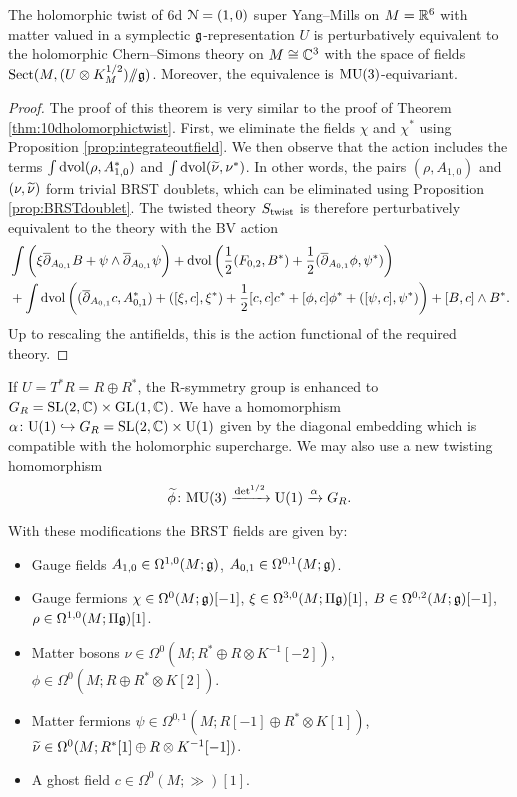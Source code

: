 \documentclass[10pt, oneside]{article}
\begin{document}
\begin{theorem}
The holomorphic twist of 6d $\mathcal N=(1, 0)$ super Yang--Mills on $M=\mathbb R^6$ with matter valued in a symplectic $\mathfrak g$-representation $U$ is perturbatively equivalent to the holomorphic Chern--Simons theory on $M\cong \mathbb C^3$ with the space of fields $\mathrm{Sect}(M, (U\otimes K_M^{1/2})/\!\!/ \mathfrak g)$. Moreover, the equivalence is $\mathrm{MU}(3)$-equivariant.
\label{thm:6dholomorphictwist}
\end{theorem}
\begin{proof}
The proof of this theorem is very similar to the proof of Theorem \ref{thm:10dholomorphictwist}. First, we eliminate the fields $\chi$ and $\chi^*$ using Proposition \ref{prop:integrateoutfield}.  We then observe that the action includes the terms $\int \operatorname{dvol}  (\rho, A_{1,0}^*)$ and $\int \operatorname{dvol} (\widetilde{\nu}, \nu^*)$.  In other words, the pairs $(\rho, A_{1,0})$ and $(\nu, \widetilde{\nu})$ form trivial BRST doublets, which can be eliminated using Proposition \ref{prop:BRSTdoublet}. The twisted theory $S_{\rm twist}$ is therefore perturbatively equivalent to the theory with the BV action 
\begin{align*}
& \int \bigg(\xi \overline{\partial}_{A_{0,1}} B  + \psi \wedge \overline{\partial}_{A_{0,1}} \psi \bigg) + \operatorname{dvol} \left(  \frac 12 (F_{0,2}, B^*) + \frac 12 (\overline{\partial}_{A_{0,1}} \phi, \psi^*)\right) \\
 &+ \int \operatorname{dvol}\left((\overline{\partial}_{A_{0, 1}} c, A_{0, 1}^*) + ([\xi, c], \xi^*) + \frac{1}{2}[c, c]c^* +  [\phi, c] \phi^* + ([\psi, c],\psi^*)\right) + [B, c] \wedge B^* .
\end{align*}
Up to rescaling the antifields, this is the action functional of the required theory.
\end{proof}

If $U=T^*R=R\oplus R^*$, the R-symmetry group is enhanced to $G_R=\mathrm{SL}(2, \mathbb C)\times \mathrm{GL}(1, \mathbb C)$. We have a homomorphism $\alpha\colon \mathrm{U}(1)\hookrightarrow G_R=\mathrm{SL}(2, \mathbb C)\times \mathrm{U}(1)$ given by the diagonal embedding which is compatible with the holomorphic supercharge. We may also use a new twisting homomorphism
\[\widetilde{\phi}\colon\mathrm{MU}(3)\xrightarrow{\det^{1/2}}\mathrm{U}(1)\xrightarrow{\alpha} G_R.\]

With these modifications the BRST fields are given by:
\begin{itemize}
\item Gauge fields $A_{1, 0} \in \Omega^{1, 0}(M; \mathfrak g)$, $A_{0, 1}\in\Omega^{0, 1}(M; \mathfrak g)$.
\item Gauge fermions $\chi\in\Omega^0(M; \mathfrak g)[-1]$, $\xi\in\Omega^{3, 0}(M; \Pi\mathfrak g)[1]$, $B\in\Omega^{0, 2}(M; \mathfrak g)[-1]$, $\rho\in\Omega^{1, 0}(M; \Pi\mathfrak g)[1]$.
\item Matter bosons $\nu\in\Omega^0(M; R^*\oplus R\otimes K^{-1}[-2])$, $\phi\in\Omega^0(M; R\oplus R^*\otimes K[2])$.
\item Matter fermions $\psi\in \Omega^{0, 1}(M; R[-1]\oplus R^*\otimes K[1])$, $\widetilde{\nu}\in\Omega^0(M; R^*[1]\oplus R\otimes K^{-1}[-1])$.
\item A ghost field $c\in \Omega^0(M; \gg)[1]$.
\end{itemize}
\end{document}
